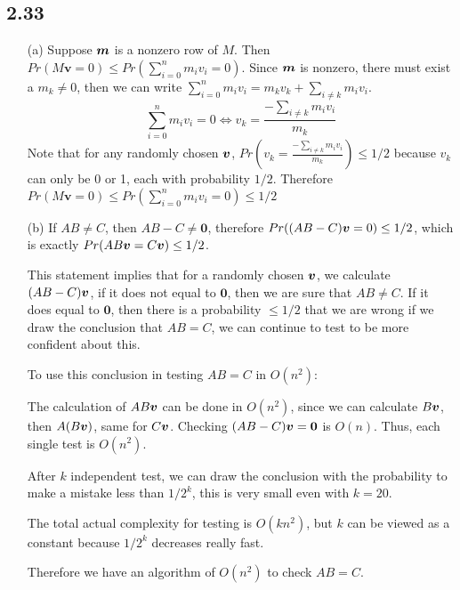 \documentclass[twoside]{homework}
\begin{document}
\subsection*{2.33}
\begin{enumerate}
	\item [(a)] Suppose $\bm{m}$ is a nonzero row of $M$. Then $Pr(M\bm{v} = 0) \leq Pr(\sum_{i=0}^n m_iv_i = 0)$. Since $\bm{m}$ is nonzero, there must exist a $m_k \neq 0$, then we can write $\sum_{i=0}^n m_iv_i = m_kv_k + \sum_{i\neq k} m_iv_i$.
		\[ \sum_{i=0}^n m_iv_i = 0 \Leftrightarrow v_k = \frac{-\sum_{i\neq k} m_iv_i}{m_k}\]
	Note that for any randomly chosen $\bm{v}$, $Pr(v_k = \frac{-\sum_{i\neq k} m_iv_i}{m_k}) \leq 1/2$ because $v_k$ can only be 0 or 1, each with probability $1/2$. Therefore $Pr(M\bm{v} = 0) \leq Pr(\sum_{i=0}^n m_iv_i = 0) \leq 1/2$


	\item [(b)] If $AB \neq C$, then $AB-C \neq \bm{0}$, therefore $Pr((AB-C)\bm{v} = 0) \leq 1/2$, which is exactly $Pr(AB\bm{v} = C\bm{v}) \leq 1/2$.

	This statement implies that for a randomly chosen $\bm{v}$, we calculate $(AB-C)\bm{v}$, if it does not equal to $\bm{0}$, then we are sure that $AB \neq C$. If it does equal to $\bm{0}$, then there is a probability  $\leq 1/2$ that we are wrong if we draw the conclusion that $AB = C$, we can continue to test to be more confident about this.

	To use this conclusion in testing $AB =C$ in $O(n^2)$:

	The calculation of $AB\bm{v}$ can be done in $O(n^2)$, since we can calculate $B\bm{v}$, then $A (B\bm{v})$, same for $C\bm{v}$. Checking $(AB-C)\bm{v} = \bm{0}$ is $O(n)$. Thus, each single test is $O(n^2)$.

	After $k$ independent test, we can draw the conclusion with the probability to make a mistake less than $1/2^k$, this is very small even with $k = 20$.

	The total actual complexity for testing is $O(kn^2)$, but $k$ can be viewed as a constant because $1/2^k$ decreases really fast.

	Therefore we have an algorithm of $O(n^2)$ to check $AB=C$.
\end{enumerate}
\end{document}

